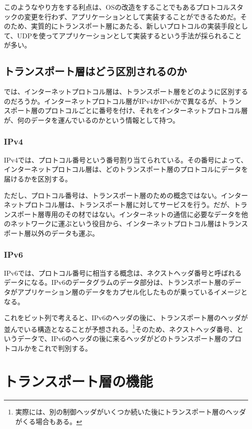 このようなやり方をする利点は、OSの改造をすることでもあるプロトコルスタックの変更を行わず、アプリケーションとして実装することができるためだ。そのため、実質的にトランスポート層にあたる、新しいプロトコルの実装手段として、UDPを使ってアプリケーションとして実装するという手法が採られることが多い。

\subsection{トランスポート層はどう区別されるのか}

では、インターネットプロトコル層は、トランスポート層をどのように区別するのだろうか。インターネットプロトコル層がIPv4かIPv6かで異なるが、トランスポート層のプロトコルごとに番号を付け、それをインターネットプロトコル層が、何のデータを運んでいるのかという情報として持つ。


\subsubsection{IPv4}

IPv4では、プロトコル番号という番号割り当てられている。その番号によって、インターネットプロトコル層は、どのトランスポート層のプロトコルにデータを届けるかを区別する。

ただし、プロトコル番号は、トランスポート層のための概念ではない。インターネットプロトコル層は、トランスポート層に対してサービスを行う。だが、トランスポート層専用のその材ではない。インターネットの通信に必要なデータを他のネットワークに運ぶという役目から、インターネットプロトコル層はトランスポート層以外のデータも運ぶ。

\subsubsection{IPv6}

IPv6では、プロトコル番号に相当する概念は、ネクストヘッダ番号と呼ばれるデータになる。IPv6のデータグラムのデータ部分は、トランスポート層のデータがアプリケーション層のデータをカプセル化したものが乗っているイメージとなる。

これをビット列で考えると、IPv6のヘッダの後に、トランスポート層のヘッダが並んでいる構造となることが予想される。\footnote{実際には、別の制御ヘッダがいくつか続いた後にトランスポート層のヘッダがくる場合もある。}そのため、ネクストヘッダ番号、というデータで、IPv6のヘッダの後に来るヘッダがどのトランスポート層のプロトコルかをこれで判別する。

\section{トランスポート層の機能}

